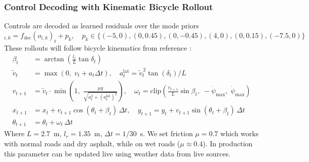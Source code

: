 \documentclass[preprint,12pt]{elsarticle}
\begin{document}
\subsubsection{Control Decoding with Kinematic Bicycle Rollout}
Controls are decoded as learned residuals over the mode priors
\begin{equation}
    [a_t, \delta_t]_{i,k} = f_{\text{dec}}({o}_{i,k})_t + {p}_{k}, \quad
    {p}_k \in \{(-5, 0), (0, 0.45), (0, -0.45), (4, 0), (0, 0.15), (-7.5, 0)\}
    \label{eq_prior}
\end{equation}
These rollouts will follow bicycle kinematics from reference \cite{kong2015kinematic}:
\begin{align}
    \beta_t &= \arctan\left(\frac{l_r}{L} \tan \delta_t\right) \label{eq_slip} \\
    \tilde{v}_{t} &= \max\left(0, \; v_t + a_t \Delta t\right), \quad a^{\text{lat}}_t = \tilde{v}_t^{\,2} \tan(\delta_t) / L \label{eq_v} \\
    v_{t+1} &= \tilde{v}_t \cdot \min\left(1, \; \frac{\mu g}{\sqrt{a_t^2 + (a^{\text{lat}}_t)^2}}\right), \quad
    \omega_t = \text{clip}\left(\frac{v_{t+1}}{L} \sin \beta_t, \; -\dot{\psi}_{\max}, \; \dot{\psi}_{\max}\right) \label{eq_yaw} \\
    x_{t+1} &= x_t + v_{t+1} \cos(\theta_t + \beta_t) \, \Delta t, \quad
    y_{t+1} = y_t + v_{t+1} \sin(\theta_t + \beta_t) \, \Delta t \label{eq_xy} \\
    \theta_{t+1} &= \theta_t + \omega_t \, \Delta t \label{eq_theta}
\end{align}
Where $L=2.7$~m, $l_r=1.35$~m, $\Delta t=1/30$~s. We set friction $\mu = 0.7$ which works with normal roads and dry asphalt, while on wet roads ($\mu \approx 0.4$). In production this parameter can be updated live using weather data from live sources.
\end{document}
